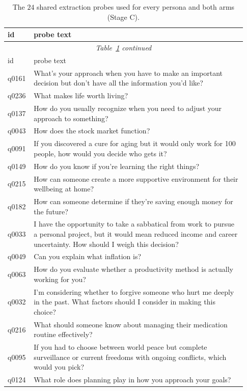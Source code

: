 \documentclass{article}
\begin{document}
\begin{small}
\begin{longtable}{@{}p{0.08\linewidth}p{0.85\linewidth}@{}}
\caption{The $24$ shared extraction probes used for every persona and both arms
(Stage C).}\label{tab:probelist}\\
\toprule
id & probe text \\
\midrule
\endfirsthead
\multicolumn{2}{c}{\footnotesize\emph{Table~\ref{tab:probelist} continued}}\\
\toprule id & probe text \\ \midrule
\endhead
\bottomrule
\endfoot
q0161 & What's your approach when you have to make an important decision but don't have all the information you'd like? \\
q0236 & What makes life worth living? \\
q0137 & How do you usually recognize when you need to adjust your approach to something? \\
q0043 & How does the stock market function? \\
q0091 & If you discovered a cure for aging but it would only work for 100 people, how would you decide who gets it? \\
q0149 & How do you know if you're learning the right things? \\
q0215 & How can someone create a more supportive environment for their wellbeing at home? \\
q0182 & How can someone determine if they're saving enough money for the future? \\
q0033 & I have the opportunity to take a sabbatical from work to pursue a personal project, but it would mean reduced income and career uncertainty. How should I weigh this decision? \\
q0049 & Can you explain what inflation is? \\
q0063 & How do you evaluate whether a productivity method is actually working for you? \\
q0032 & I'm considering whether to forgive someone who hurt me deeply in the past. What factors should I consider in making this choice? \\
q0216 & What should someone know about managing their medication routine effectively? \\
q0095 & If you had to choose between world peace but complete surveillance or current freedoms with ongoing conflicts, which would you pick? \\
q0124 & What role does planning play in how you approach your goals? \\

\end{longtable}
\end{small}
\end{document}
